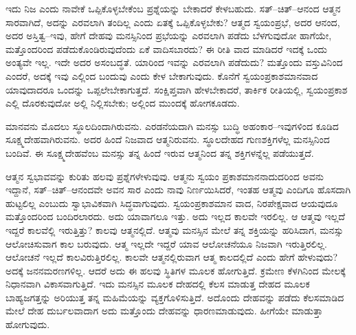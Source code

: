 ಇದು ನಿಜ ಎಂದು ನಾವೇಕೆ ಒಪ್ಪಿಕೊಳ್ಳಬೇಕೆಂಬ ಪ್ರಶ್ನೆಯನ್ನು ಬೇಕಾದರೆ ಕೇಳಬಹುದು. ಸತ್​–ಚಿತ್​–ಆನಂದ ಆತ್ಮನ ಸಾರವಾಗಿದೆ, ಅದನ್ನು ಎರವಲಾಗಿ ತಂದಿಲ್ಲ ಎಂದು ಏತಕ್ಕೆ ಒಪ್ಪಿಕೊಳ್ಳಬೇಕು? ಆತ್ಮದ ಸ್ವಯಂಪ್ರಭೆ, ಅದರ ಆನಂದ, ಅದರ ಅಸ್ತಿತ್ವ–ಇವು, ಹೇಗೆ ದೇಹವು ಮನಸ್ಸಿನಿಂದ ಪ್ರಭೆಯನ್ನು ಎರವಲಾಗಿ ಪಡೆದು ಬೆಳಗುವುದೋ ಹಾಗೆಯೇ, ಮತ್ತೊಂದರಿಂದ ಪಡೆದುಕೊಂಡಿರುವುದೆಂದು ಏಕೆ ವಾದಿಸಬಾರದು? ಈ ರೀತಿ ವಾದ ಮಾಡಿದರೆ ಇದಕ್ಕೆ ಒಂದು ಅಂತ್ಯವೇ ಇಲ್ಲ. ಇದೇ ಅದರ ಅಸಂಬದ್ಧತೆ. ಯಾರಿಂದ ಇವನ್ನು ಎರವಲಾಗಿ ಪಡೆದುದು? ಮತ್ತೊಂದು ವಸ್ತುವಿನಿಂದ ಎಂದರೆ, ಅದಕ್ಕೆ ಇವು ಎಲ್ಲಿಂದ ಬಂದುವು ಎಂದು ಕೇಳ ಬೇಕಾಗುವುದು. ಕೊನೆಗೆ ಸ್ವಯಂಪ್ರಕಾಶಮಾನವಾದ ಯಾವುದಾದರೂ ಒಂದನ್ನು ಒಪ್ಪಲೇಬೇಕಾಗುತ್ತದೆ. ಸಂಕ್ಷಿಪ್ತವಾಗಿ ಹೇಳಬೇಕಾದರೆ, ತಾರ್ಕಿಕ ರೀತಿಯಲ್ಲಿ, ಸ್ವಯಂಪ್ರಕಾಶ ಎಲ್ಲಿ ದೊರಕುವುದೋ ಅಲ್ಲಿ ನಿಲ್ಲಿಸಬೇಕು; ಅಲ್ಲಿಂದ ಮುಂದಕ್ಕೆ ಹೋಗಕೂಡದು.

ಮಾನವನು ಮೊದಲು ಸ್ಥೂಲದಿಂದಾಗಿರುವನು. ಎರಡನೆಯದಾಗಿ ಮನಸ್ಸು ಬುದ್ಧಿ ಅಹಂಕಾರ–ಇವುಗಳಿಂದ ಕೂಡಿದ ಸೂಕ್ಷ್ಮದೇಹವಾಗಿರುವನು. ಅದರ ಹಿಂದೆ ನಿಜವಾದ ಆತ್ಮನಿರುವನು. ಸ್ಥೂಲದೇಹದ ಗುಣಶಕ್ತಿಗಳೆಲ್ಲ ಮನಸ್ಸಿನಿಂದ ಬಂದಿವೆ. ಈ ಸೂಕ್ಷ್ಮದೇಹವೆಂಬ ಮನಸ್ಸು ತನ್ನ ಹಿಂದೆ ಇರುವ ಆತ್ಮನಿಂದ ತನ್ನ ಶಕ್ತಿಗಳನ್ನೆಲ್ಲ ಪಡೆಯುತ್ತದೆ.

ಆತ್ಮನ ಸ್ವಭಾವವನ್ನು ಕುರಿತು ಹಲವು ಪ್ರಶ್ನೆಗಳೇಳುವುವು. ಆತ್ಮನು ಸ್ವಯಂ ಪ್ರಕಾಶಮಾನನಾದುದರಿಂದ ಅವನು ಇದ್ದಾನೆ, ಸತ್​–ಚಿತ್​–ಆನಂದವೇ ಅವನ ಸಾರ ಎಂದು ನಾವು ನಿರ್ಣಯಿಸಿದರೆ, ಇಂತಹ ಆತ್ಮವು ಎಂದಿಗೂ ಹೊಸದಾಗಿ ಹುಟ್ಟಲಿಲ್ಲ ಎಂಬುದು ಸ್ವಾಭಾವಿಕವಾಗಿ ಸಿದ್ಧವಾಗುವುದು. ಸ್ವಯಂಪ್ರಕಾಶಮಾನ ವಾದ, ನಿರಪೇಕ್ಷವಾದ ಆಯವುದೂ ಮತ್ತೊಂದರಿಂದ ಬಂದಿರಲಾರದು. ಅದು ಯಾವಾಗಲೂ ಇತ್ತು. ಅದು ಇಲ್ಲದ ಕಾಲವೇ ಇರಲಿಲ್ಲ. ಆ ಆತ್ಮವು ಇಲ್ಲದೆ ಇದ್ದರೆ ಕಾಲವೆಲ್ಲಿ ಇರುತ್ತಿತ್ತು? ಕಾಲವು ಆತ್ಮನಲ್ಲಿದೆ. ಆತ್ಮವು ಮನಸ್ಸಿನ ಮೇಲೆ ತನ್ನ ಶಕ್ತಿಯನ್ನು ಹರಿಸಿದಾಗ, ಮನಸ್ಸು ಆಲೋಚಿಸುವಾಗ ಕಾಲ ಬರುವುದು. ಆತ್ಮ ಇಲ್ಲದೇ ಇದ್ದರೆ ಯಾವ ಆಲೋಚನೆಯೂ ನಿಜವಾಗಿ ಇರುತ್ತಿರಲಿಲ್ಲ. ಆಲೋಚನೆ ಇಲ್ಲದೆ ಕಾಲವಿರುತ್ತಿರಲಿಲ್ಲ. ಕಾಲವೇ ಆತ್ಮನಲ್ಲಿರುವಾಗ ಆತ್ಮ ಕಾಲದಲ್ಲಿದೆ ಎಂದು ಹೇಗೆ ಹೇಳುವುದು? ಅದಕ್ಕೆ ಜನನಮರಣಗಳಿಲ್ಲ. ಆದರೆ ಅದು ಈ ಹಲವು ಸ್ಥಿತಿಗಳ ಮೂಲಕ ಹೋಗುತ್ತಿದೆ. ಕ್ರಮೇಣ ಕೆಳಗಿನಿಂದ ಮೇಲಕ್ಕೆ ನಿಧಾನವಾಗಿ ವಿಕಾಸವಾಗುತ್ತಿದೆ. ಇದು ಮನಸ್ಸಿನ ಮೂಲಕ ದೇಹದಲ್ಲಿ ಕೆಲಸ ಮಾಡುತ್ತ ದೇಹದ ಮೂಲಕ ಬಾಹ್ಯಜಗತ್ತನ್ನು ಅರಿಯುತ್ತ ತನ್ನ ಮಹಿಮೆಯನ್ನು ವ್ಯಕ್ತಗೊಳಿಸುತ್ತಿದೆ. ಅದೊಂದು ದೇಹವನ್ನು ಪಡೆದು ಕೆಲಸಮಾಡಿದ ಮೇಲೆ ದೇಹ ದುರ್ಬಲವಾದಾಗ ಅದು ಮತ್ತೊಂದು ದೇಹವನ್ನು ಧಾರಣಮಾಡುವುದು. ಹೀಗೆಯೇ ಮಾಡುತ್ತಾ ಹೋಗುವುದು.

